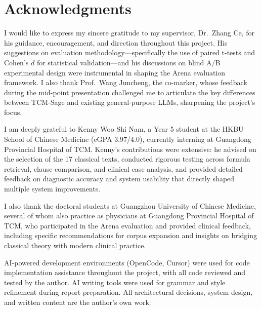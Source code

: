 \documentclass[11pt,a4paper]{report}
\begin{document}
\chapter*{Acknowledgments}

I would like to express my sincere gratitude to my supervisor, Dr.\ Zhang Ce, for his guidance, encouragement, and direction throughout this project. His suggestions on evaluation methodology---specifically the use of paired t-tests and Cohen's $d$ for statistical validation---and his discussions on blind A/B experimental design were instrumental in shaping the Arena evaluation framework. I also thank Prof.\ Wang Juncheng, the co-marker, whose feedback during the mid-point presentation challenged me to articulate the key differences between TCM-Sage and existing general-purpose LLMs, sharpening the project's focus.

I am deeply grateful to Kenny Woo Shi Nam, a Year 5 student at the HKBU School of Chinese Medicine (cGPA 3.97/4.0), currently interning at Guangdong Provincial Hospital of TCM. Kenny's contributions were extensive: he advised on the selection of the 17 classical texts, conducted rigorous testing across formula retrieval, clause comparison, and clinical case analysis, and provided detailed feedback on diagnostic accuracy and system usability that directly shaped multiple system improvements.

I also thank the doctoral students at Guangzhou University of Chinese Medicine, several of whom also practice as physicians at Guangdong Provincial Hospital of TCM, who participated in the Arena evaluation and provided clinical feedback, including specific recommendations for corpus expansion and insights on bridging classical theory with modern clinical practice.

AI-powered development environments (OpenCode, Cursor) were used for code implementation assistance throughout the project, with all code reviewed and tested by the author. AI writing tools were used for grammar and style refinement during report preparation. All architectural decisions, system design, and written content are the author's own work.

\tableofcontents
\end{document}
